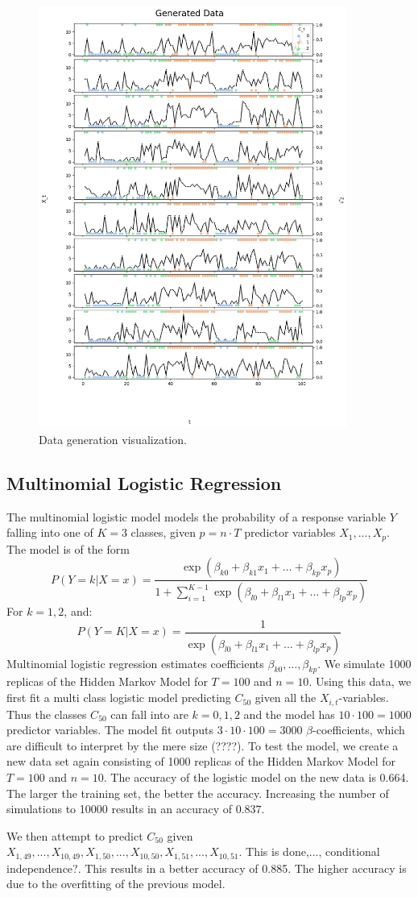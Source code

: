 \begin{figure}
\centering
  \includegraphics[width=0.9\textwidth]{latex/figures/data_generation_viz.png}
  \caption{Data generation visualization.}
  \label{fig:datagen}
\end{figure}


\subsection{Multinomial Logistic Regression}

The multinomial logistic model models the probability of a response variable $Y$ falling into one of $K=3$ classes, given $p = n \cdot T$ predictor variables $X_1,...,X_p$. The model is of the form 
$$
P(Y=k| X=x) = \frac{\exp(\beta_{k0} + \beta_{k1}x_1 +... + \beta_{kp}x_p)}{1 + \sum_{i=1}^{K-1}\exp(\beta_{l0} + \beta_{l1}x_1 +... + \beta_{lp}x_p)}
$$
For $k = 1,2$, and:
$$
P(Y=K| X=x) = \frac{1}{\exp(\beta_{l0} + \beta_{l1}x_1 +... + \beta_{lp}x_p)}
$$
Multinomial logistic regression estimates coefficients $\beta_{k0},...,\beta_{kp}$. 
We simulate 1000 replicas of the Hidden Markov Model for $T=100$ and $n = 10$. Using this data, we first fit a multi class logistic model predicting $C_{50}$ given all the $X_{i,t}$-variables. Thus the classes $C_{50}$ can fall into are $k=0,1,2$ and the model has $10\cdot 100 = 1000$ predictor variables. The model fit outputs $3 \cdot 10\cdot 100 = 3000$ $\beta$-coefficients, which are difficult to interpret by the mere size (????).
To test the model, we create a new data set again consisting of 1000 replicas of the Hidden Markov Model for $T=100$ and $n = 10$. The accuracy of the logistic model on the new data is 0.664. The larger the training set, the better the accuracy. Increasing the number of simulations to 10000 results in an accuracy of $0.837$. 

We then attempt to predict $C_{50}$ given $X_{1,49},...,X_{10,49},X_{1,50},...,X_{10,50}, X_{1,51},...,X_{10,51}$. This is done,..., conditional independence?. This results in a better accuracy of 0.885. The higher accuracy is due to the overfitting of the previous model.


